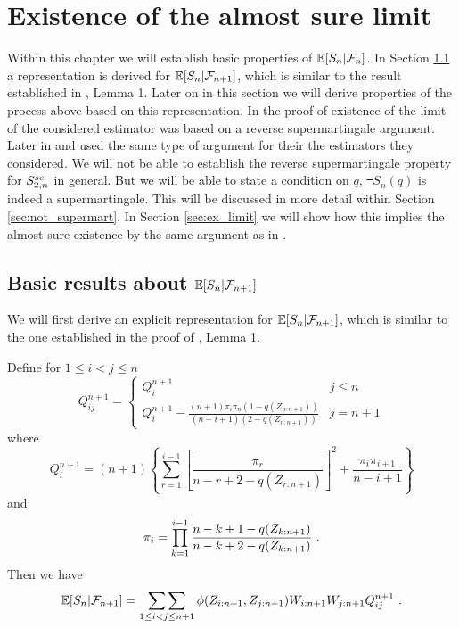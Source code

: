 \chapter{Existence of the almost sure limit}

Within this chapter we will establish basic properties of $\mathbb{E}[S_n|\mathcal{F}_n]$. In Section \ref{sec:representation} a representation is derived for $\mathbb{E}[S_n|\mathcal{F}_{n+1}]$, which is similar to the result established in \cite{bose1999strong}, Lemma 1. Later on in this section we will derive properties of the process above based on this representation. In \cite{stute1993strong} the proof of existence of the limit of the considered estimator was based on a reverse supermartingale argument. Later in \cite{dikta1998semiparametric} and \cite{bose1999strong} used the same type of argument for their the estimators they considered. We will not be able to establish the reverse supermartingale property for $S_{2,n}^{se}$ in general. But we will be able to state a condition on $q$, \st\ $S_n(q)$ is indeed a supermartingale. This will be discussed in more detail within Section \ref{sec:not_supermart}. In Section \ref{sec:ex_limit} we will show how this implies the almost sure existence by the same argument as in \cite{stute1993strong}.
%
%
%
\section{Basic results about $\mathbb{E}[S_{n}|\mathcal{F}_{n+1}]$} \label{sec:representation}
%
We will first derive an explicit representation for $\mathbb{E}[S_{n}|\mathcal{F}_{n+1}]$, which is similar to the one established in the proof of \cite{bose1999strong}, Lemma 1.
\begin{lemma} \label{lem:qi}
Define for $1\leq i<j\leq n$
\[Q_{ij}^{n+1} = \begin{cases} 
      Q_i^{n+1} & j\leq n \\
      Q_i^{n+1} - \frac{(n+1)\pi_i \pi_n (1-q(Z_{n:n+1}))}{(n-i+1)(2-q(Z_{n:n+1}))} & j=n+1
   \end{cases}
\]
%
where
\begin{equation}
	Q_i^{n+1} = (n+1) \left\{ \sum\limits_{r=1}^{i-1} \left[ \frac{\pi_r}{n-r+2-q(Z_{r:n+1})} \right]^2 + \frac{\pi_i\pi_{i+1}}{n-i+1} \right\}
	\label{eq:qi}
\end{equation}
and 
$$\pi_i = \prod\limits_{k=1}^{i-1} \frac{n-k+1-q(Z_{k:n+1})}{n-k+2-q(Z_{k:n+1})}\textrm{ .}$$
Then we have
$$\mathbb{E}[S_{n}|\mathcal{F}_{n+1}] = \mathop{\sum\sum}\limits_{1\leq i<j \leq n+1} \phi(Z_{i:n+1},Z_{j:n+1}) W_{i:n+1}W_{j:n+1}Q_{ij}^{n+1}\textrm{ .}$$
\end{lemma}

